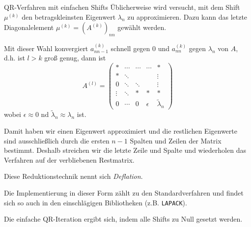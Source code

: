 \begin{bonus}{QR-Verfahren mit einfachen Shifts}
    Üblicherweise wird versucht, mit dem Shift $\mu^{(k)}$ den betragskleinsten Eigenwert $\lambda_n$ zu approximieren.
    Dazu kann das letzte Diagonalelement $\mu^{(k)} = (A^{(k)})_{nn}$ gewählt werden.

    Mit dieser Wahl konvergiert $a^{(k)}_{nn-1}$ schnell gegen $0$ und $a^{(k)}_{nn}$ gegen $\lambda_n$ von $A$, d.h. ist $l > k$ groß genug, dann ist
    \[
        A^{(l)} = \begin{pmatrix}
            *      & \cdots & \cdots & \cdots   & *                 \\
            *      & \ddots &        &          & \vdots            \\
            0      & \ddots & \ddots &          & \vdots            \\
            \vdots & \ddots & *      & *        & *                 \\
            0      & \cdots & 0      & \epsilon & \tilde{\lambda}_n
        \end{pmatrix}
    \]
    wobei $\epsilon \approx 0$ nd $\tilde{\lambda}_n \approx \lambda_n$ ist.

    Damit haben wir einen Eigenwert approximiert und die restlichen Eigenwerte sind ausschließlich durch die ersten $n-1$ Spalten und Zeilen der Matrix bestimmt.
    Deshalb streichen wir die letzte Zeile und Spalte und wiederholen das Verfahren auf der verbliebenen Restmatrix.

    Diese Reduktionstechnik nennt sich \emph{Deflation}.

    Die Implementierung in dieser Form zählt zu den Standardverfahren und findet sich so auch in den einschlägigen Bibliotheken (z.B. \texttt{LAPACK}).

    Die einfache QR-Iteration ergibt sich, indem alle Shifts zu Null gesetzt werden.
\end{bonus}